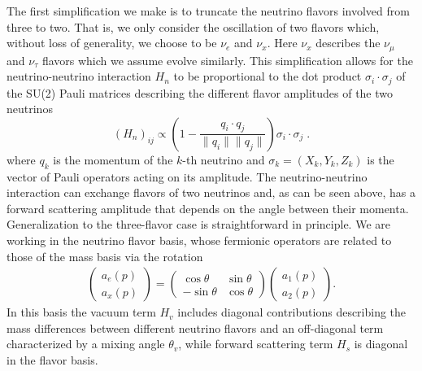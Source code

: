\documentclass[10pt]{article}
\begin{document}
The first simplification we make is to truncate the neutrino flavors involved from three to two. That is, we only consider the oscillation of two flavors which, without loss of generality, we choose to be $\nu_e$ and $\nu_x$. Here $\nu_x$ describes the $\nu_\mu$ and $\nu_\tau$ flavors which we assume evolve similarly. This simplification allows for the neutrino-neutrino interaction $H_n$ to be proportional to the dot product ${\sigma}_i \cdot {\sigma}_j$ of the SU(2) Pauli matrices
describing the different flavor amplitudes of the two neutrinos
\begin{equation}
\label{eq:fws_int}
(H_n)_{ij}\propto \left(1-\frac{{q}_i\cdot{q}_j}{\|{q}_i\|\|{q}_j\|}\right){\sigma}_i\cdot{\sigma}_j\;.
\end{equation}
where ${q}_k$ is the momentum of the $k$-th neutrino and ${\sigma}_k=(X_k,Y_k,Z_k)$ is the vector of Pauli operators acting on its amplitude. The neutrino-neutrino interaction can exchange
flavors of two neutrinos and, as can be seen above, has a forward scattering amplitude that depends on the angle between their momenta. Generalization to the three-flavor case is straightforward in principle. We are working in the neutrino flavor basis, whose fermionic operators are related to those of the mass basis via the rotation
\begin{align}
\label{flavor_mass_rotation}
\begin{pmatrix}
a_e(p) \\ a_x(p)
\end{pmatrix}
=
\begin{pmatrix}
\cos\theta & \sin\theta \\
-\sin\theta & \cos\theta 
\end{pmatrix}
\begin{pmatrix}
a_1(p) \\ a_2(p)
\end{pmatrix}
.\end{align}
In this basis the vacuum term $H_v$ includes diagonal contributions describing the mass differences between different neutrino flavors and an off-diagonal term characterized by a mixing angle $\theta_v$, while forward scattering term $H_s$ is diagonal in the flavor basis.
\end{document}
